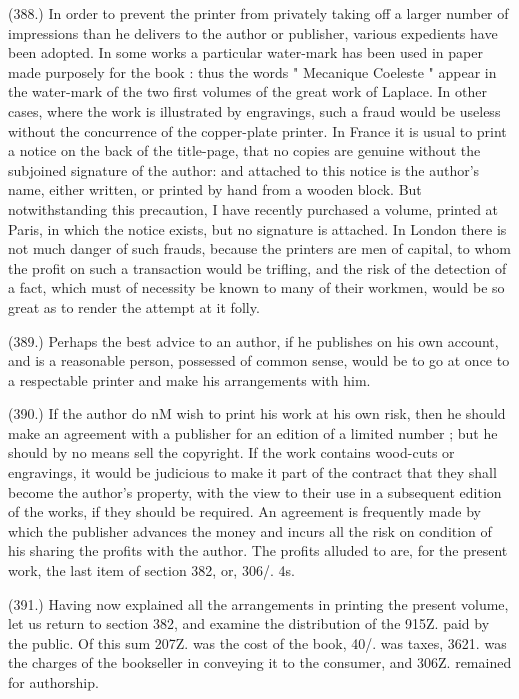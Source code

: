 \documentclass{article}
\begin{document}
(388.) In order to prevent the printer from privately taking off a larger number of impressions than he delivers to the author or publisher, various expedients have been adopted. In some works a particular water-mark has been used in paper made purposely for the book : thus the words " Mecanique Coeleste " appear in the water-mark of the two first volumes of the great work of Laplace. In other cases, where the work is illustrated by engravings, such a fraud would be useless without the concurrence of the copper-plate printer. In France it is usual to print a notice on the back of the title-page, that no copies are genuine without the subjoined signature of the author: and attached to this notice is the author's name, either written, or printed by hand from a wooden block. But notwithstanding this precaution, I have recently purchased a volume, printed at Paris, in which the notice exists, but no signature is attached. In London there is not much danger of such frauds, because the printers are men of capital, to whom the profit on such a transaction would be trifling, and the risk of the detection of a fact, which must of necessity be known to many of their workmen, would be so great as to render the attempt at it folly.


(389.) Perhaps the best advice to an author, if he publishes on his own account, and is a reasonable person, possessed of common sense, would be to go at once to a respectable printer and make his arrangements with him.


(390.) If the author do nM wish to print his work at his own risk, then he should make an agreement with a publisher for an edition of a limited number ; but he should by no means sell the copyright. If the work contains wood-cuts or engravings, it would be judicious to make it part of the contract that they shall become the author's property, with the view to their use in a subsequent edition of the works, if they should be required. An agreement is frequently made by which the publisher advances the money and incurs all the risk on condition of his sharing the profits with the author. The profits alluded to are, for the present work, the last item of section 382, or, 306/. 4s.


(391.) Having now explained all the arrangements in printing the present volume, let us return to section 382, and examine the distribution of the 915Z. paid by the public. Of this sum 207Z. was the cost of the book, 40/. was taxes, 3621. was the charges of the bookseller in conveying it to the consumer, and 306Z. remained for authorship.
\end{document}
